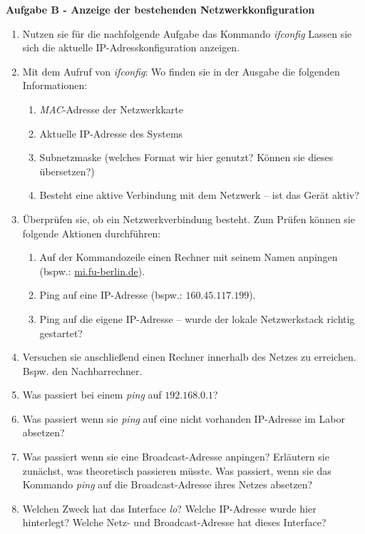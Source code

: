 \documentclass[paper=a4,fontsize=11pt]{scrartcl}%
\numberwithin{equation}{section}
\begin{document}
\begin{center} \Large{\textbf{Aufgabe B - Anzeige der bestehenden Netzwerkkonfiguration}} \end{center}

\begin{enumerate}
	\item Nutzen sie für die nachfolgende Aufgabe das Kommando \emph{ifconfig} Lassen sie sich die aktuelle IP-Adresskonfiguration anzeigen.
	\item Mit dem Aufruf von \emph{ifconfig}: Wo finden sie in der Ausgabe die folgenden Informationen:
	\begin{enumerate}
		\item \emph{MAC}-Adresse der Netzwerkkarte
		\item Aktuelle IP-Adresse des Systems
		\item Subnetzmaske (welches Format wir hier genutzt? Können sie dieses übersetzen?)
		\item Besteht eine aktive Verbindung mit dem Netzwerk -- ist das Gerät aktiv?
	\end{enumerate}
	\item Überprüfen sie, ob ein Netzwerkverbindung besteht. Zum Prüfen können sie folgende Aktionen durchführen:
	\begin{enumerate}
		\item Auf der Kommandozeile einen Rechner mit seinem Namen anpingen (bspw.: \url{mi.fu-berlin.de}).
		\item Ping auf eine IP-Adresse (bspw.: $160.45.117.199$).
		\item Ping auf die eigene IP-Adresse -- wurde der lokale Netzwerkstack richtig gestartet?
	\end{enumerate}
	\item Versuchen sie anschließend einen Rechner innerhalb des Netzes zu erreichen. Bspw. den Nachbarrechner.
	\item Was passiert bei einem \emph{ping} auf $192.168.0.1$?
	\item Was passiert wenn sie \emph{ping} auf eine nicht vorhanden IP-Adresse im  Labor absetzen?
	\item Was passiert wenn sie eine Broadcast-Adresse anpingen? Erläutern sie zunächst, was theoretisch passieren müsste. Was passiert, wenn sie das Kommando \emph{ping} auf die Broadcast-Adresse ihres Netzes absetzen?
	\item Welchen Zweck hat das Interface \emph{lo}? Welche IP-Adresse wurde hier hinterlegt? Welche Netz- und Broadcast-Adresse hat dieses Interface?
\end{enumerate}
\end{document}
